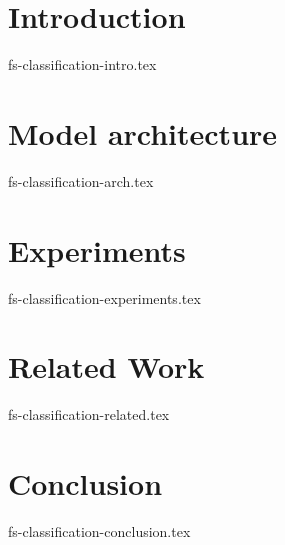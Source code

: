\documentclass[sigconf]{acmart}
\theoremstyle{remark}
\begin{document}
\thispagestyle{empty}

\section {Introduction}
 {fs-classification-intro.tex}

\section {Model architecture}
 {fs-classification-arch.tex}

\section {Experiments}
 {fs-classification-experiments.tex}

\section{Related Work}
 {fs-classification-related.tex}

\section {Conclusion}
 {fs-classification-conclusion.tex}



\end{document}
